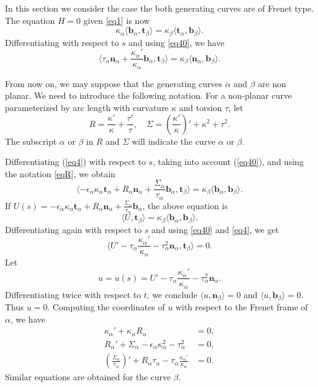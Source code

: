 \documentclass[a4paper,12pt]{amsart}
\numberwithin{equation}{section}
\theoremstyle{definition}
\def\t{\mathbf t}
\def\n{\mathbf n}
\def\b{\mathbf b}
\begin{document}
 In this section we consider the case the both generating curves are of Frenet type.    The equation $H=0$ given \eqref{eq1} is now
 \begin{equation}\label{eq40}
 \kappa_\alpha\langle\b_\alpha,\t_\beta\rangle=\kappa_\beta\langle\t_\alpha,\b_\beta\rangle.
 \end{equation}
 Differentiating with respect to $s$ and using \eqref{eq40}, we have
\begin{equation}\label{eq4}
\langle \tau_\alpha\n_\alpha +\frac{\kappa_\alpha'}{\kappa_\alpha}  \b_\alpha,\t_\beta\rangle=\kappa_\beta\langle\n_\alpha,\b_\beta\rangle.
\end{equation}
 
From now on, we may suppose that the generating curves $\alpha$ and $\beta$ are non planar. We need to introduce the following notation. For a non-planar curve parameterized by arc length  with curvature $\kappa$ and torsion $\tau$, let
\begin{equation}\label{eqR}
R=\frac{\kappa'}{\kappa}+\frac{\tau'}{\tau},\quad \Sigma=\left(\frac{\kappa'}{\kappa}\right)'+\kappa^2+\tau^2.
\end{equation}
The subscript $\alpha$ or $\beta$ in $R$ and $\Sigma$ will indicate  the  curve $\alpha$ or $\beta$. 

Differentiating   (\ref{eq4}) with respect to   $s$, taking into account  (\ref{eq40}), and using the notation \eqref{eqR}, we obtain
$$\langle-\epsilon_\alpha\kappa_\alpha\t_\alpha+R_\alpha\n_\alpha+\frac{\Sigma_\alpha}{\tau_\alpha} \b_\alpha,\t_\beta\rangle=\kappa_\beta\langle\b_\alpha,\b_\beta\rangle.$$
If $U(s)=-\epsilon_\alpha\kappa_\alpha\t_\alpha+R_\alpha\n_\alpha+\frac{\Sigma_\alpha}{\tau_\alpha} \b_\alpha$,
the above equation is 
$$\langle U,\t_\beta\rangle=\kappa_\beta\langle\b_\alpha,\b_\beta\rangle.$$
Differentiating again with respect to $s$ and using   \eqref{eq40} and \eqref{eq4}, we get
$$\langle U'-\tau_\alpha\frac{\kappa_\alpha'}{\kappa_\alpha}-\tau_\alpha^2\n_\alpha,\t_\beta\rangle=0.$$
Let 
$$u=u(s)=U'-\tau_\alpha\frac{\kappa_\alpha'}{\kappa_\alpha}-\tau_\alpha^2\n_\alpha.$$
Differentiating twice with respect to $t$, we conclude $\langle u,\n_\beta\rangle=0$ and $\langle u,\b_\beta\rangle=0$. Thus $u=0$. Computing the coordinates of $u$ with respect to the Frenet frame of $\alpha$, we have
\begin{equation}\label{ta}
\begin{split}
 \kappa_\alpha'+\kappa_\alpha R_\alpha&=0,\\
 R_\alpha'+\Sigma_\alpha-\epsilon_\alpha\kappa_\alpha^2-\tau_\alpha^2&=0,\\
 \left(\frac{\Sigma_\alpha}{\tau_\alpha}\right)'+R_\alpha\tau_\alpha-\tau_\alpha\frac{\kappa_\alpha'}{\kappa_\alpha}&=0.
 \end{split}
 \end{equation}
 Similar equations are obtained for the curve $\beta$.
 
\end{document}
